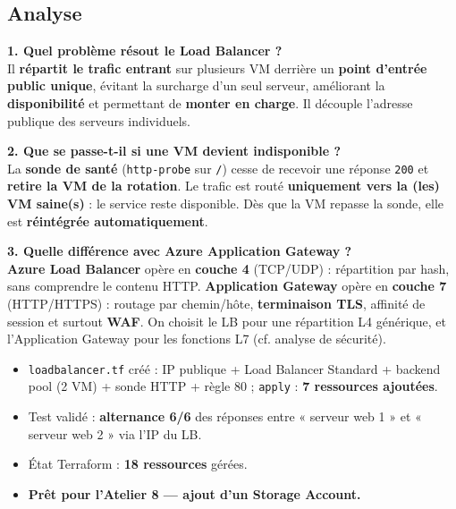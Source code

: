 \documentclass[11pt,a4paper]{article}
\newcommand{\code}[1]{\texttt{#1}}
\begin{document}
\subsection{Analyse}
\textbf{1. Quel problème résout le Load Balancer ?}\\
Il \textbf{répartit le trafic entrant} sur plusieurs VM derrière un \textbf{point d'entrée public unique},
évitant la surcharge d'un seul serveur, améliorant la \textbf{disponibilité} et permettant de \textbf{monter en
charge}. Il découple l'adresse publique des serveurs individuels.

\textbf{2. Que se passe-t-il si une VM devient indisponible ?}\\
La \textbf{sonde de santé} (\code{http-probe} sur \code{/}) cesse de recevoir une réponse \code{200} et
\textbf{retire la VM de la rotation}. Le trafic est routé \textbf{uniquement vers la (les) VM saine(s)} : le
service reste disponible. Dès que la VM repasse la sonde, elle est \textbf{réintégrée automatiquement}.

\textbf{3. Quelle différence avec Azure Application Gateway ?}\\
\textbf{Azure Load Balancer} opère en \textbf{couche 4} (TCP/UDP) : répartition par hash, sans comprendre le
contenu HTTP. \textbf{Application Gateway} opère en \textbf{couche 7} (HTTP/HTTPS) : routage par chemin/hôte,
\textbf{terminaison TLS}, affinité de session et surtout \textbf{WAF}. On choisit le LB pour une répartition L4
générique, et l'Application Gateway pour les fonctions L7 (cf. analyse de sécurité).

\begin{etatbox}
\begin{itemize}
  \item \code{loadbalancer.tf} créé : IP publique + Load Balancer Standard + backend pool (2 VM) + sonde HTTP + règle 80 ; \code{apply} : \textbf{7 ressources ajoutées}.
  \item Test validé : \textbf{alternance 6/6} des réponses entre « serveur web 1 » et « serveur web 2 » via l'IP du LB.
  \item État Terraform : \textbf{18 ressources} gérées.
  \item \textbf{Prêt pour l'Atelier 8 — ajout d'un Storage Account.}
\end{itemize}
\end{etatbox}


\end{document}
